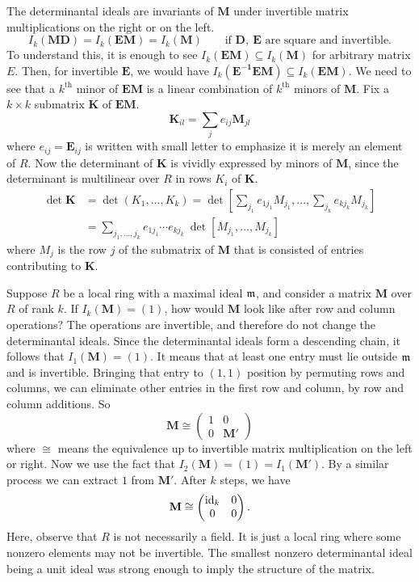 The determinantal ideals are invariants of $\mathbf M$ 
under invertible matrix multiplications on the right or on the left.
\[
 I_k ( \mathbf {M D} ) = I_k( \mathbf{E M} ) = I_k (\mathbf M) \quad 
\quad \text{if $\mathbf{D,~E}$ are square and invertible.}
\]
To understand this, it is enough to see $I_k( \mathbf{E M} ) \subseteq I_k( \mathbf M )$ for arbitrary matrix $E$.
Then, for invertible $\mathbf E$, we would have $I_k(\mathbf{E^{-1} E M }) \subseteq I_k(\mathbf{E M})$.
We need to see that a $k^\text{th}$ minor of $ \mathbf{E M}$ is a linear combination of $k^\text{th}$ minors of $\mathbf M$.
Fix a $k \times k$ submatrix $\mathbf K$ of $\mathbf{EM}$.
\[
 \mathbf K_{il} = \sum_{j} e _{ij} \mathbf M _{j l} 
\]
where $e_{ij} = \mathbf{E}_{ij}$ is written with small letter to emphasize it is merely an element of $R$.
Now the determinant of $\mathbf K$ is vividly expressed by minors of $\mathbf M$,
since the determinant is multilinear over $R$ in rows $K_i$ of $\mathbf K$.
\begin{align*}
 \det \mathbf K 
&= \det( K_1, \ldots, K_k ) 
= \det \left[ \sum_{j_1} e_{1 j_1} M_{j_1}, \ldots, \sum_{j_k} e_{k j_k} M_{j_k} \right]\\
&= \sum_{j_1,\ldots,j_k} e_{1 j_1} \cdots e_{k j_k} ~\det \left[  M_{j_1},\ldots, M_{j_k} \right]
\end{align*}
where $M_j$ is the row $j$ of the submatrix of $\mathbf M$ that is consisted of entries contributing to $\mathbf K$.


Suppose $R$ be a local ring with a maximal ideal $\mathfrak{m}$,
and consider a matrix $\mathbf M$ over $R$ of rank $k$.
If $I_k(\mathbf M) = (1)$, how would $\mathbf M$ look like after row and column operations?
The operations are invertible, and therefore do not change the determinantal ideals.
Since the determinantal ideals form a descending chain,
it follows that $I_1(\mathbf M) = (1)$.
It means that at least one entry must lie outside $\mathfrak{m}$ and is invertible.
Bringing that entry to $(1,1)$ position by permuting rows and columns,
we can eliminate other entries in the first row and column, by row and column additions.
So
\[
 \mathbf M \cong \begin{pmatrix} 1 & 0 \\ 0 & \mathbf M' \end{pmatrix}
\]
where $\cong$ means the equivalence up to invertible matrix multiplication on the left or right.
Now we use the fact that $I_2(\mathbf M) = (1) = I_1( \mathbf M' )$.
By a similar process we can extract $1$ from $\mathbf M'$.
After $k$ steps, we have
\begin{equation}
 \mathbf M \cong \begin{pmatrix} \mathrm{id}_k & 0 \\ 0 & 0 \end{pmatrix}.
\label{free-module-presentation}
\end{equation}
Here, observe that $R$ is not necessarily a field.
It is just a local ring where some nonzero elements may not be invertible.
The smallest nonzero determinantal ideal being a unit ideal
was strong enough to imply the structure of the matrix.

